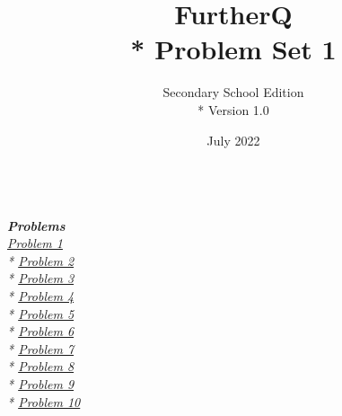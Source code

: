 
\title{FurtherQ \\* Problem Set 1}
\author{Secondary School Edition \\* Version 1.0}
\date{July 2022}




\maketitle
\textit{
  \textbf{\\\Large{Problems}}\\
  \large
  \hyperlink{P1}{Problem 1} \\*
  \hyperlink{P2}{Problem 2} \\*
  \hyperlink{P3}{Problem 3} \\*
  \hyperlink{P4}{Problem 4} \\*
  \hyperlink{P5}{Problem 5} \\*
  \hyperlink{P6}{Problem 6} \\*
  \hyperlink{P7}{Problem 7} \\*
  \hyperlink{P8}{Problem 8} \\*
  \hyperlink{P9}{Problem 9} \\*
  \hyperlink{P10}{Problem 10} \\\\
}
